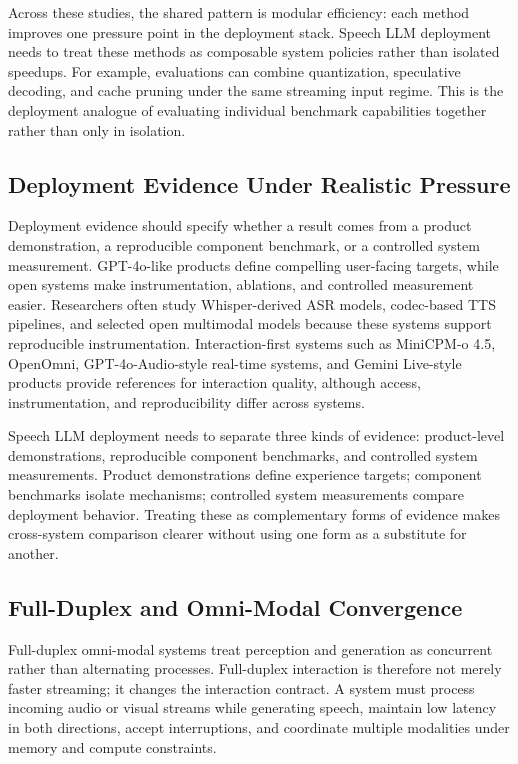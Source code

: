 Across these studies, the shared pattern is modular efficiency: each method improves one pressure point in the deployment stack. Speech LLM deployment needs to treat these methods as composable system policies rather than isolated speedups. For example, evaluations can combine quantization, speculative decoding, and cache pruning under the same streaming input regime. This is the deployment analogue of evaluating individual benchmark capabilities together rather than only in isolation.

\subsection{Deployment Evidence Under Realistic Pressure}

Deployment evidence should specify whether a result comes from a product demonstration, a reproducible component benchmark, or a controlled system measurement. GPT-4o-like products define compelling user-facing targets, while open systems make instrumentation, ablations, and controlled measurement easier. Researchers often study Whisper-derived ASR models, codec-based TTS pipelines, and selected open multimodal models because these systems support reproducible instrumentation. Interaction-first systems such as MiniCPM-o 4.5, OpenOmni, GPT-4o-Audio-style real-time systems, and Gemini Live-style products provide references for interaction quality, although access, instrumentation, and reproducibility differ across systems.

Speech LLM deployment needs to separate three kinds of evidence: product-level demonstrations, reproducible component benchmarks, and controlled system measurements. Product demonstrations define experience targets; component benchmarks isolate mechanisms; controlled system measurements compare deployment behavior. Treating these as complementary forms of evidence makes cross-system comparison clearer without using one form as a substitute for another.

\subsection{Full-Duplex and Omni-Modal Convergence}

Full-duplex omni-modal systems treat perception and generation as concurrent rather than alternating processes. Full-duplex interaction is therefore not merely faster streaming; it changes the interaction contract. A system must process incoming audio or visual streams while generating speech, maintain low latency in both directions, accept interruptions, and coordinate multiple modalities under memory and compute constraints.

